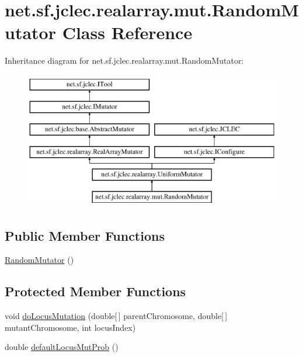 \hypertarget{classnet_1_1sf_1_1jclec_1_1realarray_1_1mut_1_1_random_mutator}{\section{net.\-sf.\-jclec.\-realarray.\-mut.\-Random\-Mutator Class Reference}
\label{classnet_1_1sf_1_1jclec_1_1realarray_1_1mut_1_1_random_mutator}
}
Inheritance diagram for net.\-sf.\-jclec.\-realarray.\-mut.\-Random\-Mutator\-:\begin{figure}[H]
\begin{center}
\leavevmode
\includegraphics[height=6.000000cm]{classnet_1_1sf_1_1jclec_1_1realarray_1_1mut_1_1_random_mutator}
\end{center}
\end{figure}
\subsection*{Public Member Functions}
\begin{DoxyCompactItemize}
\item 
\hyperlink{classnet_1_1sf_1_1jclec_1_1realarray_1_1mut_1_1_random_mutator_a9c514953ccef18bb53c535c8a3894f0e}{Random\-Mutator} ()
\end{DoxyCompactItemize}
\subsection*{Protected Member Functions}
\begin{DoxyCompactItemize}
\item 
void \hyperlink{classnet_1_1sf_1_1jclec_1_1realarray_1_1mut_1_1_random_mutator_a3d2115aeef10ecec76c26fa84f8909de}{do\-Locus\-Mutation} (double\mbox{[}$\,$\mbox{]} parent\-Chromosome, double\mbox{[}$\,$\mbox{]} mutant\-Chromosome, int locus\-Index)
\item 
double \hyperlink{classnet_1_1sf_1_1jclec_1_1realarray_1_1mut_1_1_random_mutator_ad7c15df67cde465055524cc43609e66d}{default\-Locus\-Mut\-Prob} ()
\end{DoxyCompactItemize}
